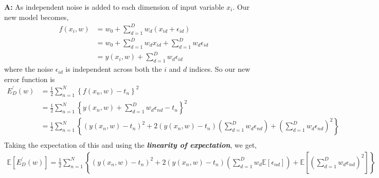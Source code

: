 \documentclass[english,a4paper,12pt]{article}
\begin{document}
\begin{enumerate}
\textbf{A:} As independent noise is added to each dimension of
input variable $x_i$. Our new model becomes,
    $$
\begin{aligned}
f\left(x_{i}, w\right) &=w_{0}+\sum_{d=1}^{D} w_{d}\left(x_{id}+\epsilon_{i d}\right) \\
&=w_{0}+\sum_{d=1}^{D} w_{d} x_{i d}+\sum_{d=1}^{D} w_{d} \epsilon_{i d} \\
&=y\left(x_{i}, w\right)+\sum_{d=1}^{D} w_{d} \epsilon_{i d}
\end{aligned}
$$
where the noise $\epsilon_{i d}$ is independent across both the $i$ and $d$ indices. So our new error function is
$$
\begin{aligned}
E_{D}^{\prime}(w) &=\frac{1}{2} \sum_{n=1}^{N}\left\{f\left(x_{n}, w\right)-t_{n}\right\}^{2} \\
&=\frac{1}{2} \sum_{n=1}^{N}\left\{y\left(x_{n}, w\right)+\sum_{d=1}^{D} w_{d} \epsilon_{n d}-t_{n}\right\}^2 \\
&=\frac{1}{2} \sum_{n=1}^{N}\left\{\left(y\left(x_{n}, w\right)-t_{n}\right)^{2}+2\left(y\left(x_{n}, w\right)-t_{n}\right)\left(\sum_{d=1}^{D} w_{d} \epsilon_{n d}\right)+\left(\sum_{d=1}^{D} w_{d} \epsilon_{n d}\right)^{2}\right\} \\
\end{aligned}
$$
Taking the expectation of this and using the \textit{\textbf{linearity of expectation}}, we get, \\
$$
\begin{aligned}
\mathbb{E}\left[E_{D}^{\prime}(w)\right]=\frac{1}{2} \sum_{n=1}^{N}\left\{\left(y\left(x_{n}, w\right)-t_{n}\right)^{2}+2\left(y\left(x_{n}, w\right)-t_{n}\right)\left(\sum_{d=1}^{D} w_{d} \mathbb{E}\left[\epsilon_{n d}\right]\right)+\mathbb{E}\left[\left(\sum_{d=1}^{D} w_{d} \epsilon_{n d}\right)^{2}\right]\right\}
\end{aligned}
$$


\end{enumerate}
\end{document}
